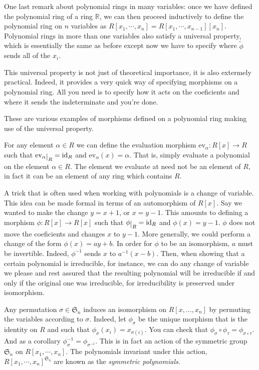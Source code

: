 \documentclass[12pt,oneside]{book}
\numberwithin{table}{section}
\numberwithin{equation}{section}
\numberwithin{figure}{section}
\newcommand{\rest}[1]{\raisebox{-.5ex}{$|$}_{#1}}
\newcommand{\R}{\mathbb{R}}
\renewcommand{\S}{\mathfrak{S}}
\newcommand{\id}{\mathrm{id}}
\newcommand{\ev}[1]{\mathrm{ev}_{#1}}
\begin{document}
One last remark about polynomial rings in many variables: once we have defined the polynomial ring of a ring \( \R \), we can then proceed inductively to define the polynomial ring on \( n \) variables as \( R[x_1, \cdots, x_n] = R[x_1, \cdots, x_{n-1}][x_n] \). Polynomial rings in more than one variables also satisfy a universal property, which is essentially the same as before except now we have to specify where \( \tilde{\phi} \) sends all of the \( x_i \).

This universal property is not just of theoretical importance, it is also extermely practical. Indeed, it provides a very quick way of specifying morphisms on a polynomial ring. All you need is to specify how it acts on the coeficients and where it sends the indeterminate and you're done.

\begin{example}\label{exe:morphisms on polynomial rings}
	These are various examples of morphisms defined on a polynomial ring making use of the universal property.
	\begin{points}
	\item For any element \( \alpha \in R \) we can define the evaluation morphism \( \ev{\alpha} \colon R[x] \to R \) such that \( \ev{\alpha}\rest{R} = \id_R \) and \( \ev{\alpha}(x) = \alpha \). That is, simply evaluate a polynomial on the element \( \alpha \in R \). The element we evaluate at need not be an element of \( R \), in fact it can be an element of any ring which contains \( R \). 

	\item A trick that is often used when working with polynomials is a change of variable. This idea can be made formal in terms of an automorphism of \( R[x] \). Say we wanted to make the change \( y = x+1 \), or \( x = y-1 \). This amounts to defining a morphism \( \phi \colon R[x] \to R[x] \) such that \( \phi \rest{R} = \id_R \) and \( \phi(x) = y-1 \). \( \phi \) does not move the coeficients and changes \( x \) to \( y-1 \). More generally, we could perform a change of the form \( \phi(x) = ay + b \). In order for \( \phi \) to be an isomorphism, \( a \) must be invertible. Indeed, \( \phi^{-1} \) sends \( x \) to \( a^{-1}(x - b) \). Then, when showing that a certain polynomial is irreducible, for instance, we can do any change of variable we please and rest assured that the resulting polynomial will be irreducible if and only if the original one was irreducible, for irreducibility is preserved under isomorphism.	

	\item Any permutation \( \sigma \in \S_n \) induces an isomorphism on \( R[x, \dots, x_n] \) by permuting the variables according to \( \sigma \). Indeed, let \( \phi_{\sigma} \) be the unique morphism that is the identity on \( R \) and such that \( \phi_{\sigma}(x_i) = x_{\sigma(i)} \). You can check that \( \phi_{\sigma} \circ \phi_{\tau} = \phi_{\sigma \circ \tau} \). And as a corollary \( \phi_{\sigma}^{-1} = \phi_{\sigma^{-1}} \). This is in fact an action of the symmetric group \( \S_n \) on \( R[x_1, \cdots, x_n] \). The polynomials invariant under this action, \( R[x_1, \cdots, x_n]^{\S_n} \) are known as the \emph{symmetric polynomials}.


\end{points}
\end{example}
\end{document}
